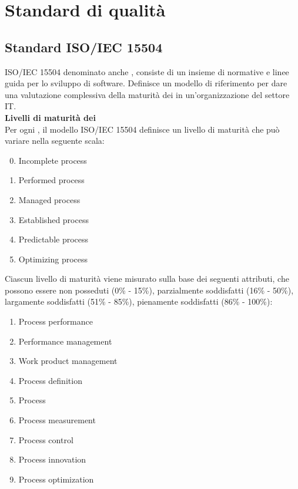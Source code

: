 \newpage
\section{Standard di qualità}
\subsection{Standard ISO/IEC 15504}\label{AppQualitaProcessi}
ISO/IEC 15504 denominato anche \textbf{}, consiste di un insieme di normative e linee guida per lo sviluppo di  software.
Definisce un modello di riferimento per dare una valutazione complessiva della maturità dei  in un'organizzazione del settore IT.\\
\textbf{Livelli di maturità dei }\\
Per ogni , il modello ISO/IEC 15504 definisce un livello di maturità che può variare nella seguente scala:
\begin{enumerate}
\setcounter{enumi}{-1}
\item Incomplete process
\item Performed process
\item Managed process
\item Established process
\item Predictable process  
\item Optimizing process
\end{enumerate}
Ciascun livello di maturità viene misurato sulla base dei seguenti attributi, che possono essere non posseduti (0\% - 15\%), parzialmente soddisfatti (16\% - 50\%), largamente soddisfatti (51\% - 85\%), pienamente soddisfatti (86\% - 100\%):
\begin{enumerate}
\item Process performance
\item Performance management
\item Work product management
\item Process definition
\item Process 
\item Process measurement
\item Process control
\item Process innovation
\item Process optimization
\end{enumerate}
